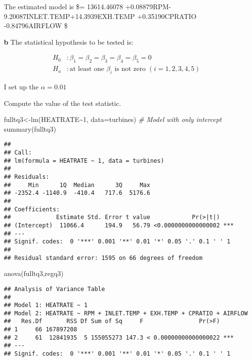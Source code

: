\documentclass[
]{article}
\newenvironment{Shaded}{\begin{snugshade}}{\end{snugshade}}
\newcommand{\AttributeTok}[1]{\textcolor[rgb]{0.77,0.63,0.00}{#1}}
\newcommand{\CommentTok}[1]{\textcolor[rgb]{0.56,0.35,0.01}{\textit{#1}}}
\newcommand{\DecValTok}[1]{\textcolor[rgb]{0.00,0.00,0.81}{#1}}
\newcommand{\FunctionTok}[1]{\textcolor[rgb]{0.00,0.00,0.00}{#1}}
\newcommand{\NormalTok}[1]{#1}
\newcommand{\OtherTok}[1]{\textcolor[rgb]{0.56,0.35,0.01}{#1}}
\newcommand{\SpecialCharTok}[1]{\textcolor[rgb]{0.00,0.00,0.00}{#1}}
\begin{document}
The estimated model is \$= 13614.46078
+0.08879RPM-9.20087INLET.TEMP+14.3939EXH.TEMP +0.35190CPRATIO
-0.84796AIRFLOW \$

\textbf{b} The statistical hypothesis to be tested is:

\[
\begin{aligned}
H_0&:\beta_1=\beta_2=\beta_3=\beta_4=\beta_5=0 \\
H_a&:\mbox{at least one }\beta_i\mbox{ is not zero } (i=1,2,3,4,5) 
\end{aligned}
\]

I set up the \(\alpha = 0.01\)

Compute the value of the test statistic.

\begin{Shaded}
\begin{Highlighting}[]
\NormalTok{fulltq3}\OtherTok{\textless{}{-}}\FunctionTok{lm}\NormalTok{(HEATRATE}\SpecialCharTok{\textasciitilde{}}\DecValTok{1}\NormalTok{, }\AttributeTok{data=}\NormalTok{turbines) }\CommentTok{\# Model with only intercept}
\FunctionTok{summary}\NormalTok{(fulltq3)}
\end{Highlighting}
\end{Shaded}

\begin{verbatim}
## 
## Call:
## lm(formula = HEATRATE ~ 1, data = turbines)
## 
## Residuals:
##     Min      1Q  Median      3Q     Max 
## -2352.4 -1140.9  -410.4   717.6  5176.6 
## 
## Coefficients:
##             Estimate Std. Error t value            Pr(>|t|)    
## (Intercept)  11066.4      194.9   56.79 <0.0000000000000002 ***
## ---
## Signif. codes:  0 '***' 0.001 '**' 0.01 '*' 0.05 '.' 0.1 ' ' 1
## 
## Residual standard error: 1595 on 66 degrees of freedom
\end{verbatim}

\begin{Shaded}
\begin{Highlighting}[]
\FunctionTok{anova}\NormalTok{(fulltq3,regq3)}
\end{Highlighting}
\end{Shaded}

\begin{verbatim}
## Analysis of Variance Table
## 
## Model 1: HEATRATE ~ 1
## Model 2: HEATRATE ~ RPM + INLET.TEMP + EXH.TEMP + CPRATIO + AIRFLOW
##   Res.Df       RSS Df Sum of Sq     F                Pr(>F)    
## 1     66 167897208                                             
## 2     61  12841935  5 155055273 147.3 < 0.00000000000000022 ***
## ---
## Signif. codes:  0 '***' 0.001 '**' 0.01 '*' 0.05 '.' 0.1 ' ' 1
\end{verbatim}
\end{document}
